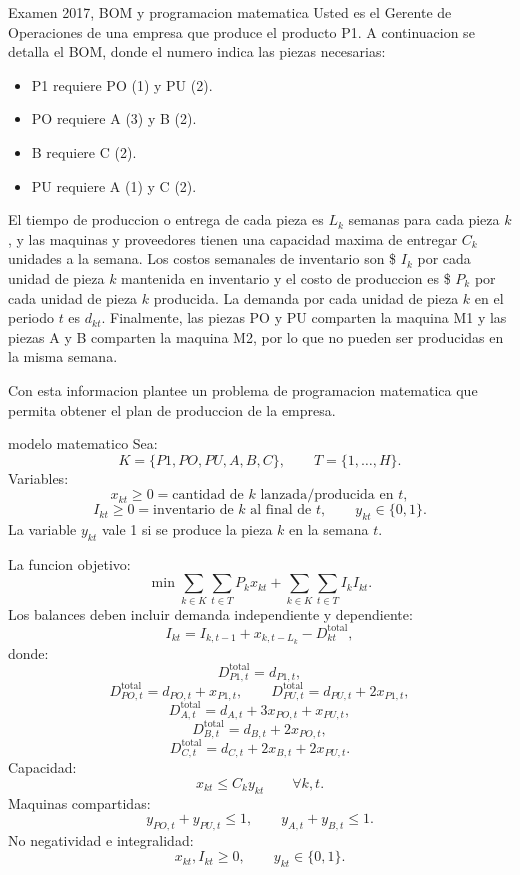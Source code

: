 \begin{enunciado}{Examen 2017, BOM y programacion matematica}
Usted es el Gerente de Operaciones de una empresa que produce el producto P1. A continuacion se detalla el BOM, donde el numero indica las piezas necesarias:

\begin{itemize}
  \item P1 requiere PO (1) y PU (2).
  \item PO requiere A (3) y B (2).
  \item B requiere C (2).
  \item PU requiere A (1) y C (2).
\end{itemize}

El tiempo de produccion o entrega de cada pieza es $L_k$ semanas para cada pieza $k$, y las maquinas y proveedores tienen una capacidad maxima de entregar $C_k$ unidades a la semana. Los costos semanales de inventario son \$ $I_k$ por cada unidad de pieza $k$ mantenida en inventario y el costo de produccion es \$ $P_k$ por cada unidad de pieza $k$ producida. La demanda por cada unidad de pieza $k$ en el periodo $t$ es $d_{kt}$. Finalmente, las piezas PO y PU comparten la maquina M1 y las piezas A y B comparten la maquina M2, por lo que no pueden ser producidas en la misma semana.

Con esta informacion plantee un problema de programacion matematica que permita obtener el plan de produccion de la empresa.
\end{enunciado}

\begin{pautacompleta}{modelo matematico}
Sea:
\[
  K=\{P1,PO,PU,A,B,C\},\qquad T=\{1,\ldots,H\}.
\]
Variables:
\[
  x_{kt}\geq 0=\text{cantidad de }k\text{ lanzada/producida en }t,
\]
\[
  I_{kt}\geq 0=\text{inventario de }k\text{ al final de }t,
  \qquad
  y_{kt}\in\{0,1\}.
\]
La variable $y_{kt}$ vale 1 si se produce la pieza $k$ en la semana $t$.

La funcion objetivo:
\[
  \min \sum_{k\in K}\sum_{t\in T} P_kx_{kt}
  +\sum_{k\in K}\sum_{t\in T} I_k I_{kt}.
\]
Los balances deben incluir demanda independiente y dependiente:
\[
  I_{kt}=I_{k,t-1}+x_{k,t-L_k}-D_{kt}^{\text{total}},
\]
donde:
\[
  D_{P1,t}^{\text{total}}=d_{P1,t},
\]
\[
  D_{PO,t}^{\text{total}}=d_{PO,t}+x_{P1,t},
  \qquad
  D_{PU,t}^{\text{total}}=d_{PU,t}+2x_{P1,t},
\]
\[
  D_{A,t}^{\text{total}}=d_{A,t}+3x_{PO,t}+x_{PU,t},
\]
\[
  D_{B,t}^{\text{total}}=d_{B,t}+2x_{PO,t},
\]
\[
  D_{C,t}^{\text{total}}=d_{C,t}+2x_{B,t}+2x_{PU,t}.
\]
Capacidad:
\[
  x_{kt}\leq C_k y_{kt}\qquad \forall k,t.
\]
Maquinas compartidas:
\[
  y_{PO,t}+y_{PU,t}\leq 1,\qquad
  y_{A,t}+y_{B,t}\leq 1.
\]
No negatividad e integralidad:
\[
  x_{kt},I_{kt}\geq 0,\qquad y_{kt}\in\{0,1\}.
\]
\end{pautacompleta}

